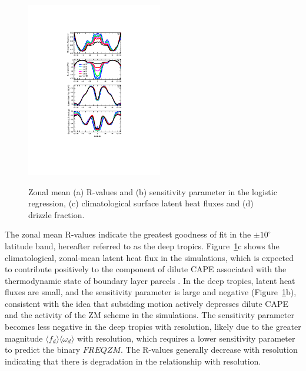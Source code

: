 \documentclass[times]{qjrms4}
\begin{document}
\begin{figure}
\begin{center}
\noindent\includegraphics[width=14pc,angle=0]{figs/temp_4zonal.pdf}\\
\end{center}
\caption{Zonal mean (a) R-values and (b) sensitivity parameter in the logistic regression, (c) climatological surface latent heat fluxes and (d) drizzle fraction.}
\label{fig:4zonal}
\end{figure}

The zonal mean R-values indicate the greatest goodness of fit in the $\pm 10^{\circ}$ latitude band, hereafter referred to as the deep tropics. Figure~\ref{fig:4zonal}c shows the climatological, zonal-mean latent heat flux in the simulations, which is expected to contribute positively to the component of dilute CAPE associated with the thermodynamic state of boundary layer parcels \citep{Z2002JGR}. In the deep tropics, latent heat fluxes are small, and the sensitivity parameter is large and negative (Figure~\ref{fig:4zonal}b), consistent with the idea that subsiding motion actively depresses dilute CAPE and the activity of the ZM scheme in the simulations. The sensitivity parameter becomes less negative in the deep tropics with resolution, likely due to the greater magnitude $\langle f_{d} \rangle \langle \omega_{d} \rangle$ with resolution, which requires a lower sensitivity parameter to predict the binary $FREQZM$. The R-values generally decrease with resolution indicating that there is degradation in the relationship with resolution.
\end{document}
